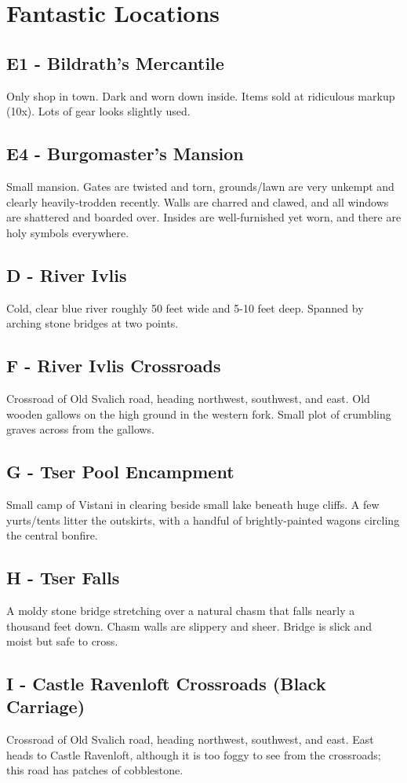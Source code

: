 \documentclass[a4paper,11pt]{article}
\begin{document}
\section{Fantastic Locations}
\label{sec:FantasticLocations}
\subsection{E1 - Bildrath's Mercantile}
  Only shop in town. Dark and worn down inside. Items sold at ridiculous markup (10x). Lots of gear looks 
  slightly used.
\subsection{E4 - Burgomaster's Mansion}
  Small mansion. Gates are twisted and torn, grounds/lawn are very unkempt and clearly heavily-trodden recently.
  Walls are charred and clawed, and all windows are shattered and boarded over. Insides are well-furnished yet
  worn, and there are holy symbols everywhere.
\subsection{D - River Ivlis}
  Cold, clear blue river roughly 50 feet wide and 5-10 feet deep. Spanned by arching stone bridges at two points.
\subsection{F - River Ivlis Crossroads}
  Crossroad of Old Svalich road, heading northwest, southwest, and east. Old wooden gallows on the high ground 
  in the western fork. Small plot of crumbling graves across from the gallows.
\subsection{G - Tser Pool Encampment}
  Small camp of Vistani in clearing beside small lake beneath huge cliffs. A few yurts/tents litter the
  outskirts, with a handful of brightly-painted wagons circling the central bonfire.
\subsection{H - Tser Falls}
  A moldy stone bridge stretching over a natural chasm that falls nearly a thousand feet down. Chasm walls are 
  slippery and sheer. Bridge is slick and moist but safe to cross.
\subsection{I - Castle Ravenloft Crossroads (Black Carriage)}
  Crossroad of Old Svalich road, heading northwest, southwest, and east. East heads to Castle Ravenloft, 
  although it is too foggy to see from the crossroads; this road has patches of cobblestone.
\end{document}

